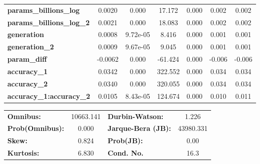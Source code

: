 \begin{center}
\begin{tabular}{lcccccc}
\textbf{params\_billions\_log}      &       0.0020  &        0.000     &    17.172  &         0.000        &        0.002    &        0.002     \\
\textbf{params\_billions\_log\_2}   &       0.0021  &        0.000     &    18.083  &         0.000        &        0.002    &        0.002     \\
\textbf{generation}                 &       0.0008  &     9.72e-05     &     8.416  &         0.000        &        0.001    &        0.001     \\
\textbf{generation\_2}              &       0.0009  &     9.67e-05     &     9.045  &         0.000        &        0.001    &        0.001     \\
\textbf{param\_diff}                &      -0.0062  &        0.000     &   -61.424  &         0.000        &       -0.006    &       -0.006     \\
\textbf{accuracy\_1}                &       0.0342  &        0.000     &   322.552  &         0.000        &        0.034    &        0.034     \\
\textbf{accuracy\_2}                &       0.0340  &        0.000     &   320.055  &         0.000        &        0.034    &        0.034     \\
\textbf{accuracy\_1:accuracy\_2}    &       0.0105  &     8.43e-05     &   124.674  &         0.000        &        0.010    &        0.011     \\
\bottomrule
\end{tabular}
\begin{tabular}{lclc}
\textbf{Omnibus:}       & 10663.141 & \textbf{  Durbin-Watson:     } &     1.226  \\
\textbf{Prob(Omnibus):} &    0.000  & \textbf{  Jarque-Bera (JB):  } & 43980.331  \\
\textbf{Skew:}          &    0.824  & \textbf{  Prob(JB):          } &      0.00  \\
\textbf{Kurtosis:}      &    6.830  & \textbf{  Cond. No.          } &      16.3  \\
\bottomrule
\end{tabular}
\end{center}